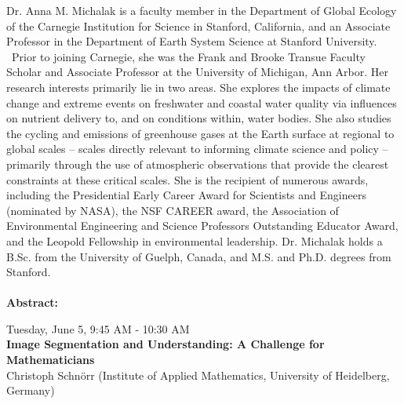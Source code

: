 Dr. Anna M. Michalak is a faculty member in the Department of Global Ecology of the Carnegie Institution for Science in Stanford, California, and an Associate Professor in the Department of Earth System Science at Stanford University.  Prior to joining Carnegie, she was the Frank and Brooke Transue Faculty Scholar and Associate Professor at the University of Michigan, Ann Arbor. Her research interests primarily lie in two areas.  She explores the impacts of climate change and extreme events on freshwater and coastal water quality via influences on nutrient delivery to, and on conditions within, water bodies. She also studies the cycling and emissions of greenhouse gases at the Earth surface at regional to global scales – scales directly relevant to informing climate science and policy – primarily through the use of atmospheric observations that provide the clearest constraints at these critical scales. She is the recipient of numerous awards, including the Presidential Early Career Award for Scientists and Engineers (nominated by NASA), the NSF CAREER award, the Association of Environmental Engineering and Science Professors Outstanding Educator Award, and the Leopold Fellowship in environmental leadership.  Dr. Michalak holds a B.Sc. from the University of Guelph, Canada, and M.S. and Ph.D. degrees from Stanford.    
\\\\

\textbf{Abstract:}\\

  


\newpage\vspace{2cm}
\begin{center}{\Large{
      Tuesday, June 5, 9:45 AM - 10:30 AM \\
      \textbf{Image Segmentation and Understanding: A Challenge for Mathematicians}\\
      Christoph Schnörr (Institute of Applied Mathematics, University of Heidelberg, Germany)  
}}
\end{center}
\vspace{1cm}

\begin{wrapfloat}{figure}{o}{0pt}
  \texttt{[image: \{images/speakers/schnoerr@math.uni-heidelberg.de]}.jpg}
\end{wrapfloat}

